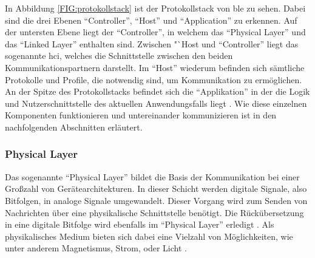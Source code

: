 In Abbildung \ref{FIG:protokollstack} ist der Protokollstack von \ac{ble} zu sehen. Dabei sind die drei Ebenen "`Controller"', "`Host"' und "`Application"' zu erkennen. Auf der untersten Ebene liegt der "`Controller"', in welchem das "`Physical Layer"' und das "`Linked Layer"' enthalten sind. Zwischen "`Host und "`Controller"' liegt das sogenannte \ac{hci}, welches die Schnittstelle zwischen den beiden Kommunikationspartnern darstellt. Im "`Host"' wiederum befinden sich sämtliche Protokolle und Profile, die notwendig sind, um Kommunikation zu ermöglichen. An der Spitze des Protokollstacks befindet sich die "`Applikation"' in der die Logik und Nutzerschnittstelle des aktuellen Anwendungsfalls liegt \cite[15]{Townsend14:GSB}. Wie diese einzelnen Komponenten funktionieren und untereinander kommunizieren ist in den nachfolgenden Abschnitten erläutert.\\  

\subsubsection{Physical Layer}
\label{sss:funktionsweise:physical}

Das sogenannte "`Physical Layer"' bildet die Basis der Kommunikation bei einer Großzahl von Gerätearchitekturen. In dieser Schicht werden digitale Signale, also Bitfolgen, in analoge Signale umgewandelt. Dieser Vorgang wird zum Senden von Nachrichten über eine physikalische Schnittstelle benötigt. Die Rückübersetzung in eine digitale Bitfolge wird ebenfalls im "`Physical Layer"' erledigt \cite[Seite 16]{Townsend14:GSB}. Als physikalisches Medium bieten sich dabei eine Vielzahl von Möglichkeiten, wie unter anderem Magnetismus, Strom, oder Licht \cite[Seite 95 - 101]{Tanenbaum14:CN}.\\

